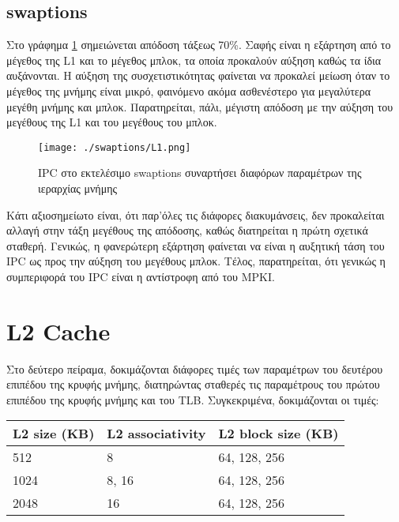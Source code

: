 \documentclass{article}
\newcommand{\eng}[1]{\foreignlanguage{english}{#1}}
\begin{document}
\clearpage
\subsection{\eng{swaptions}}

Στο γράφημα \ref{fig:exp1-swaptions} σημειώνεται απόδοση τάξεως 70\%. Σαφής είναι η εξάρτηση από το μέγεθος της \eng{L1} και το μέγεθος μπλοκ, τα οποία προκαλούν αύξηση καθώς τα ίδια αυξάνονται. Η αύξηση της συσχετιστικότητας φαίνεται να προκαλεί μείωση όταν το μέγεθος της μνήμης είναι μικρό, φαινόμενο ακόμα ασθενέστερο για μεγαλύτερα μεγέθη μνήμης και μπλοκ. Παρατηρείται, πάλι, μέγιστη απόδοση με την αύξηση του μεγέθους της \eng{L1} και του μεγέθους του μπλοκ.

\begin{figure}[h]
    \centering
    \texttt{[image: ./swaptions/L1.png]} 
    \caption{\eng{IPC} στο εκτελέσιμο \eng{swaptions} συναρτήσει διαφόρων παραμέτρων της ιεραρχίας μνήμης}
    \label{fig:exp1-swaptions}
\end{figure}
\FloatBarrier

Κάτι αξιοσημείωτο είναι, ότι παρ'όλες τις διάφορες διακυμάνσεις, δεν προκαλείται αλλαγή στην τάξη μεγέθους της απόδοσης, καθώς διατηρείται η πρώτη σχετικά σταθερή. Γενικώς, η φανερώτερη εξάρτηση φαίνεται να είναι η αυξητική τάση του \eng{IPC} ως προς την αύξηση του μεγέθους μπλοκ. Τέλος, παρατηρείται, ότι γενικώς η συμπεριφορά του \eng{IPC} είναι η αντίστροφη από του \eng{MPKI}.

\clearpage
\section{\eng{L2 Cache}}

Στο δεύτερο πείραμα, δοκιμάζονται διάφορες τιμές των παραμέτρων του δευτέρου επιπέδου της κρυφής μνήμης, διατηρώντας σταθερές τις παραμέτρους του πρώτου επιπέδου της κρυφής μνήμης και του \eng{TLB}. Συγκεκριμένα, δοκιμάζονται οι τιμές:

\begin{table}[h]
    \centering
    \begin{tabular}{|p{3cm}|p{3cm}|p{3cm}|}
        \hline
        L2 size (KB) & L2 associativity & L2 block size (KB)\\
        \hline
        512 & 8 & 64, 128, 256\\
        \hline    
        1024 & 8, 16 & 64, 128, 256\\
        \hline
        2048 & 16 & 64, 128, 256\\
        \hline
    \end{tabular}
\end{table}
\end{document}
